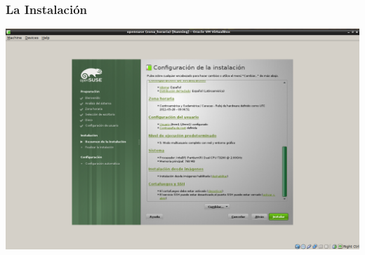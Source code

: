 \documentclass{beamer}
\begin{document}
\begin{frame}
\frametitle{La Instalaci\'on}
\includegraphics[height=0.8\textheight]{14_.png} \hspace*{7.3cm}
\end{frame} 
\end{document}
